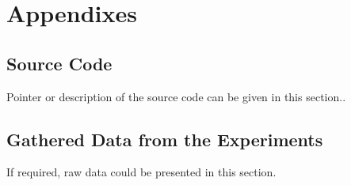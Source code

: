 
\chapter{Appendixes}
\label{chapter:appendixes}

\newpage

\section{Source Code}

\label{deliverable:source-code}

Pointer or description of the source code can be given in this section..

\section{Gathered Data from the Experiments}

If required, raw data could be presented in this section.